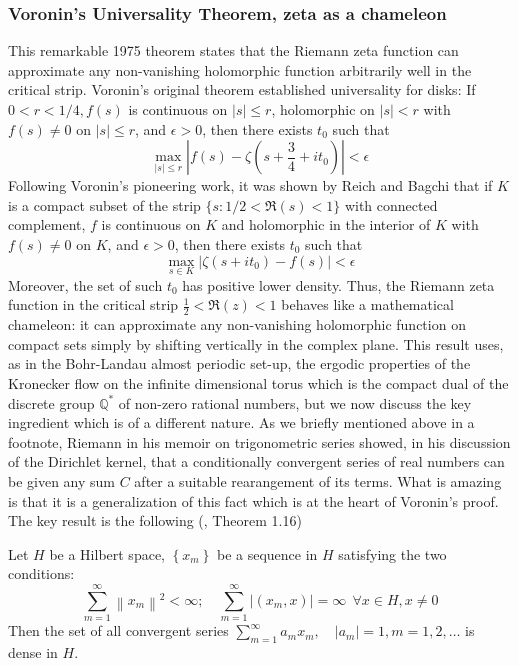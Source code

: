\documentclass{article}
\def\Q{{\mathbb Q}}
\begin{document}
\subsubsection{Voronin's Universality Theorem, zeta as a chameleon} This remarkable 1975 theorem \cite{Voronin} states that the Riemann zeta function can approximate any non-vanishing holomorphic function arbitrarily well in the critical strip. Voronin's original theorem  established universality for disks: If $0<r<1 / 4, f(s)$ is continuous on $|s| \leq r$, holomorphic on $|s|<r$ with $f(s) \neq 0$ on $|s| \leq r$, and $\epsilon>0$, then there exists $t_0$ such that
$$
\max _{|s| \leq r}\left|f(s)-\zeta\left(s+\frac{3}{4}+i t_0\right)\right|<\epsilon
$$
 Following Voronin's pioneering work, it was shown by Reich and Bagchi that if $K$ is a compact subset of the strip $\{s : 1/2 < \Re(s) < 1\}$ with connected complement, $f$ is continuous on $K$ and holomorphic in the interior of $K$ with $f(s) \neq 0$ on $K$, and $\epsilon > 0$, then there exists $t_0$ such that
    \[
    \max_{s \in K} |\zeta(s + it_0) - f(s)| < \epsilon
    \]
    Moreover, the set of such $t_0$ has positive lower density. Thus, the Riemann zeta function in the critical strip $\frac 12<\Re(z)<1$
 behaves like a mathematical chameleon: it can approximate any non-vanishing holomorphic function on compact sets simply by shifting vertically in the complex plane. This result uses, as in the Bohr-Landau almost periodic set-up, the ergodic properties  of the Kronecker flow  on the infinite dimensional torus which is the compact dual of the discrete group $\Q^*$ of non-zero rational numbers, but we now discuss the key ingredient which is of a different nature. \newline As we briefly mentioned above in a footnote, Riemann in his memoir on trigonometric series showed, in his discussion of the Dirichlet kernel, that a conditionally convergent series of real numbers can be given any sum $C$ after a suitable rearangement of its terms. What is amazing is that it is a generalization of this fact which is at the heart of Voronin's proof. 
The key result is the following (\cite{Laurincikas}, Theorem 1.16)
\begin{graybox}
Let $H$ be a Hilbert space, $\left\{x_m\right\}$ be a sequence in $H$ satisfying the two conditions:
 $$\sum_{m=1}^{\infty}\left\|x_m\right\|^2<\infty;
 \quad \sum_{m=1}^{\infty}\left|\left(x_m, x\right)\right|=\infty \ \ \forall  x\in H, x\neq 0$$
Then the set of all convergent series
$
\sum_{m=1}^{\infty} a_m x_m, \quad\left|a_m\right|=1, m=1,2, \ldots
$
is dense in $H$.
\end{graybox}
\end{document}
